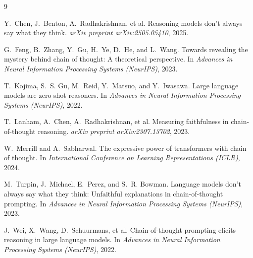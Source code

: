 \documentclass[11pt]{article}
\begin{document}

\begin{thebibliography}{9}

Y.~Chen, J.~Benton, A.~Radhakrishnan, et al.
\newblock Reasoning models don't always say what they think.
\newblock \emph{arXiv preprint arXiv:2505.05410}, 2025.

G.~Feng, B.~Zhang, Y.~Gu, H.~Ye, D.~He, and L.~Wang.
\newblock Towards revealing the mystery behind chain of thought: A theoretical
  perspective.
\newblock In \emph{Advances in Neural Information Processing Systems (NeurIPS)},
  2023.

T.~Kojima, S.~S. Gu, M.~Reid, Y.~Matsuo, and Y.~Iwasawa.
\newblock Large language models are zero-shot reasoners.
\newblock In \emph{Advances in Neural Information Processing Systems (NeurIPS)},
  2022.

T.~Lanham, A.~Chen, A.~Radhakrishnan, et al.
\newblock Measuring faithfulness in chain-of-thought reasoning.
\newblock \emph{arXiv preprint arXiv:2307.13702}, 2023.

W.~Merrill and A.~Sabharwal.
\newblock The expressive power of transformers with chain of thought.
\newblock In \emph{International Conference on Learning Representations (ICLR)},
  2024.

M.~Turpin, J.~Michael, E.~Perez, and S.~R. Bowman.
\newblock Language models don't always say what they think: Unfaithful
  explanations in chain-of-thought prompting.
\newblock In \emph{Advances in Neural Information Processing Systems (NeurIPS)},
  2023.

J.~Wei, X.~Wang, D.~Schuurmans, et al.
\newblock Chain-of-thought prompting elicits reasoning in large language models.
\newblock In \emph{Advances in Neural Information Processing Systems (NeurIPS)},
  2022.

\end{thebibliography}
\end{document}
